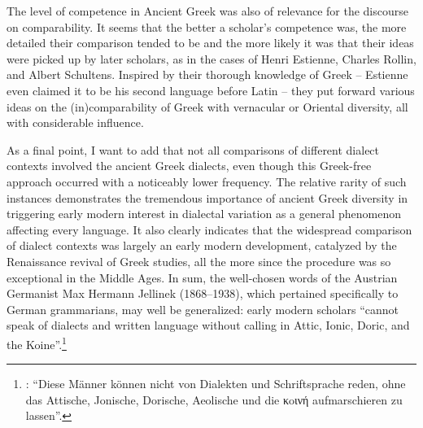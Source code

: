 The level of competence in Ancient Greek was also of relevance for the discourse on comparability. It seems that the better a scholar’s competence was, the more detailed their comparison tended to be and the more likely it was that their ideas were picked up by later scholars, as in the cases of Henri Estienne, Charles Rollin, and Albert Schultens. Inspired by their thorough knowledge of Greek – Estienne even claimed it to be his second language before Latin – they put forward various ideas on the (in)comparability of Greek with vernacular or Oriental diversity, all with considerable influence.

As a final point, I want to add that not all comparisons of different dialect contexts involved the ancient Greek dialects, even though this Greek-free approach occurred with a noticeably lower frequency. The relative rarity of such instances demonstrates the tremendous importance of ancient Greek diversity in triggering early modern interest in dialectal variation as a general phenomenon affecting every language. It also clearly indicates that the widespread comparison of dialect contexts was largely an early modern development, catalyzed by the Renaissance revival of Greek studies, all the more since the procedure was so exceptional in the Middle Ages. In sum, the well-chosen words of the Austrian Germanist Max Hermann Jellinek (1868–1938), which pertained specifically to German grammarians, may well be generalized: early modern scholars “cannot speak of dialects and written language without calling in Attic, Ionic, Doric, and the Koine”.\footnote{\citet[21]{Jellinek1913}: “Diese Männer können nicht von Dialekten und Schriftsprache reden, ohne das Attische, Jonische, Dorische, Aeolische und die κoινή aufmarschieren zu lassen”.}

